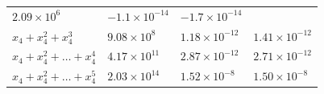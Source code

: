 \documentclass[
]{article}
\begin{document}
\begin{longtable}[]{@{}llll@{}}
\begin{minipage}[t]{0.15\columnwidth}
\(2.09 \times 10^{6}\)\strut
\end{minipage} & \begin{minipage}[t]{0.36\columnwidth}\raggedright
\(-1.1 \times 10^{-14}\)\strut
\end{minipage} & \begin{minipage}[t]{0.15\columnwidth}\raggedright
\(-1.7 \times 10^{-14}\)\strut
\end{minipage}\tabularnewline
\begin{minipage}[t]{0.23\columnwidth}\raggedright
\(x_{4}+x_{4}^{2}+x_{4}^{3}\)\strut
\end{minipage} & \begin{minipage}[t]{0.15\columnwidth}\raggedright
\(9.08 \times 10^{8}\)\strut
\end{minipage} & \begin{minipage}[t]{0.36\columnwidth}\raggedright
\(1.18 \times 10^{-12}\)\strut
\end{minipage} & \begin{minipage}[t]{0.15\columnwidth}\raggedright
\(1.41 \times 10^{-12}\)\strut
\end{minipage}\tabularnewline
\begin{minipage}[t]{0.23\columnwidth}\raggedright
\(x_{4}+x_{4}^{2}+\dots+x_{4}^{4}\)\strut
\end{minipage} & \begin{minipage}[t]{0.15\columnwidth}\raggedright
\(4.17 \times 10^{11}\)\strut
\end{minipage} & \begin{minipage}[t]{0.36\columnwidth}\raggedright
\(2.87 \times 10^{-12}\)\strut
\end{minipage} & \begin{minipage}[t]{0.15\columnwidth}\raggedright
\(2.71 \times 10^{-12}\)\strut
\end{minipage}\tabularnewline
\begin{minipage}[t]{0.23\columnwidth}\raggedright
\(x_{4}+x_{4}^{2}+\dots+x_{4}^{5}\)\strut
\end{minipage} & \begin{minipage}[t]{0.15\columnwidth}\raggedright
\(2.03 \times 10^{14}\)\strut
\end{minipage} & \begin{minipage}[t]{0.36\columnwidth}\raggedright
\(1.52 \times 10^{-8}\)\strut
\end{minipage} & \begin{minipage}[t]{0.15\columnwidth}\raggedright
\(1.50 \times 10^{-8}\)\strut
\end{minipage}\tabularnewline

\end{longtable}
\end{document}
